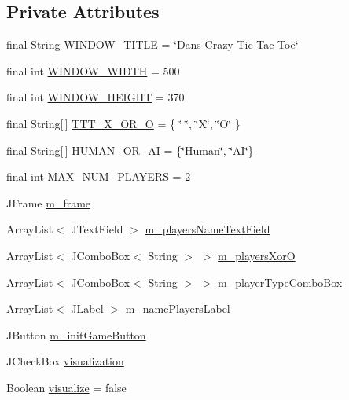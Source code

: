 \subsection*{Private Attributes}
\begin{DoxyCompactItemize}
\item 
final String \hyperlink{class_menu_1_1_menu_t_t_t_a415b411bb82c4159d053e2e3a87a9061}{W\+I\+N\+D\+O\+W\+\_\+\+T\+I\+T\+L\+E} = \char`\"{}Dans Crazy Tic Tac Toe\char`\"{}
\item 
final int \hyperlink{class_menu_1_1_menu_t_t_t_a07f18d5ed40cd020290f7cb16ffadca8}{W\+I\+N\+D\+O\+W\+\_\+\+W\+I\+D\+T\+H} = 500
\item 
final int \hyperlink{class_menu_1_1_menu_t_t_t_a5f9a3dacb45dd6f4f1749aa86d1b1154}{W\+I\+N\+D\+O\+W\+\_\+\+H\+E\+I\+G\+H\+T} = 370
\item 
final String\mbox{[}$\,$\mbox{]} \hyperlink{class_menu_1_1_menu_t_t_t_a05b9b5552eecd3dd9b969a21817f9789}{T\+T\+T\+\_\+\+X\+\_\+\+O\+R\+\_\+\+O} = \{ \char`\"{} \char`\"{}, \char`\"{}X\char`\"{}, \char`\"{}O\char`\"{} \}
\item 
final String\mbox{[}$\,$\mbox{]} \hyperlink{class_menu_1_1_menu_t_t_t_ae21a60dde8c0681fe99ca3a163713775}{H\+U\+M\+A\+N\+\_\+\+O\+R\+\_\+\+A\+I} = \{\char`\"{}Human\char`\"{}, \char`\"{}A\+I\char`\"{}\}
\item 
final int \hyperlink{class_menu_1_1_menu_t_t_t_a634a62eb8c913decb22f2b27ad64e2b6}{M\+A\+X\+\_\+\+N\+U\+M\+\_\+\+P\+L\+A\+Y\+E\+R\+S} = 2
\item 
J\+Frame \hyperlink{class_menu_1_1_menu_t_t_t_a22f4227f781ebf5a22bb0c68c588537d}{m\+\_\+frame}
\item 
Array\+List$<$ J\+Text\+Field $>$ \hyperlink{class_menu_1_1_menu_t_t_t_a2398e606664e494a0bfd92cd4990404f}{m\+\_\+players\+Name\+Text\+Field}
\item 
Array\+List$<$ J\+Combo\+Box$<$ String $>$ $>$ \hyperlink{class_menu_1_1_menu_t_t_t_a1f431306714855f214aacab632031a23}{m\+\_\+players\+Xor\+O}
\item 
Array\+List$<$ J\+Combo\+Box$<$ String $>$ $>$ \hyperlink{class_menu_1_1_menu_t_t_t_a0d29323e5abc375ee10f1b27ecd6e1bd}{m\+\_\+player\+Type\+Combo\+Box}
\item 
Array\+List$<$ J\+Label $>$ \hyperlink{class_menu_1_1_menu_t_t_t_a3a18e1c57089dedf1bdb8808affb405b}{m\+\_\+name\+Players\+Label}
\item 
J\+Button \hyperlink{class_menu_1_1_menu_t_t_t_a59b7acc44f8e856bd54c46a8c81b1990}{m\+\_\+init\+Game\+Button}
\item 
J\+Check\+Box \hyperlink{class_menu_1_1_menu_t_t_t_a611b82f2267f9ccb007b1ee5744e3088}{visualization}
\item 
Boolean \hyperlink{class_menu_1_1_menu_t_t_t_a9d69fa1e5f80800c37ee3c47925f3f14}{visualize} = false
\end{DoxyCompactItemize}


